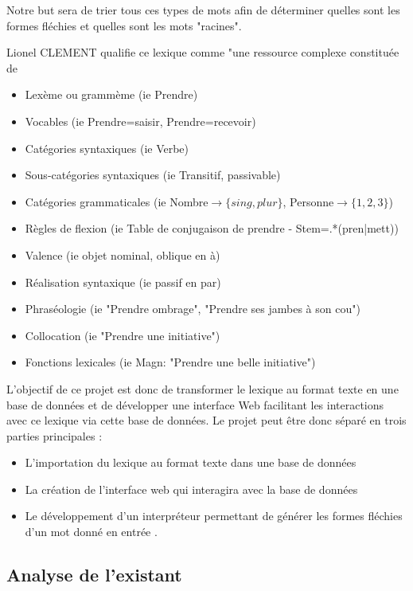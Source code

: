 \documentclass[12pt,a4paper]{article}
\begin{document}
Notre but sera de trier tous ces types de mots afin de déterminer quelles sont les formes fléchies et quelles sont les mots "racines".

Lionel CLEMENT qualifie ce lexique comme "une ressource complexe constituée de
\begin{itemize}
\item Lexème ou grammème (ie Prendre)
\item Vocables (ie Prendre=saisir, Prendre=recevoir)
\item Catégories syntaxiques (ie Verbe)
\item Sous-catégories syntaxiques (ie Transitif, passivable)
\item Catégories grammaticales (ie Nombre$\rightarrow\{sing, plur\}$, Personne$\rightarrow\{1, 2, 3\}$)
\item Règles de flexion (ie Table de conjugaison de prendre - Stem=.*(pren|mett))
\item Valence (ie objet nominal, oblique en à)
\item Réalisation syntaxique (ie passif en par)
\item Phraséologie (ie "Prendre ombrage", "Prendre ses jambes à son cou")
\item Collocation (ie "Prendre une initiative")
\item Fonctions lexicales (ie Magn: "Prendre une belle initiative")
\end{itemize}

L'objectif de ce projet est donc de transformer le lexique au format texte en une base de données et de développer une interface Web facilitant les interactions avec ce lexique via cette base de données.
Le projet peut être donc séparé en trois parties principales : 
\begin{itemize}
    \item L'importation du lexique au format texte dans une base de données
    \item La création de l'interface web qui interagira avec la base de données
    \item Le développement d'un interpréteur permettant de générer les formes fléchies d'un mot donné en entrée .
\end{itemize}
\subsection{Analyse de l'existant}
\end{document}
